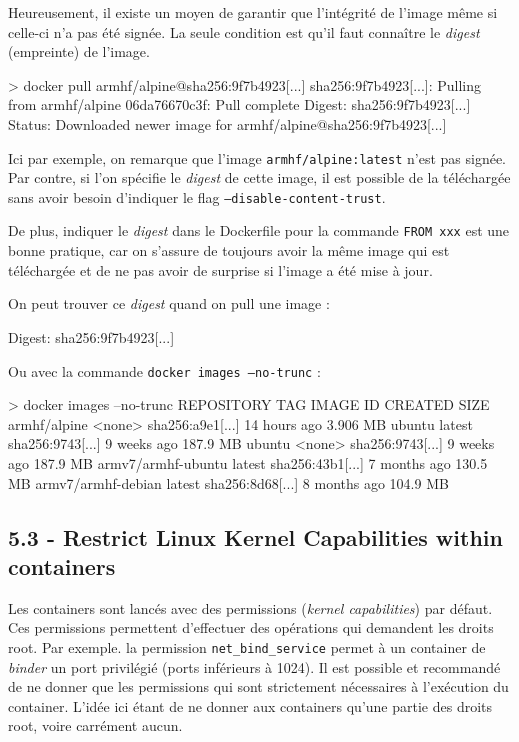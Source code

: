 \documentclass[11pt,a4paper,oneside]{report}
\newcommand{\code}[1]{\texttt{#1}}
\begin{document}
Heureusement, il existe un moyen de garantir que l'intégrité de l'image même si celle-ci n'a pas été signée. La seule condition est qu'il faut connaître le \textit{digest} (empreinte) de l'image.

\begin{textcode}
> docker pull armhf/alpine@sha256:9f7b4923[...]
sha256:9f7b4923[...]: Pulling from armhf/alpine
06da76670c3f: Pull complete 
Digest: sha256:9f7b4923[...]
Status: Downloaded newer image for armhf/alpine@sha256:9f7b4923[...]
\end{textcode}

Ici par exemple, on remarque que l'image \code{armhf/alpine:latest} n'est pas signée. Par contre, si l'on spécifie le \textit{digest} de cette image, il est possible de la téléchargée sans avoir besoin d'indiquer le flag \code{--disable-content-trust}.

De plus, indiquer le \textit{digest} dans le Dockerfile pour la commande \code{FROM xxx} est une bonne pratique, car on s'assure de toujours avoir la même image qui est téléchargée et de ne pas avoir de surprise si l'image a été mise à jour.

On peut trouver ce \textit{digest} quand on pull une image :
\begin{textcode}
Digest: sha256:9f7b4923[...]
\end{textcode}

Ou avec la commande \code{docker images --no-trunc} :

\begin{textcode}
> docker images --no-trunc
REPOSITORY          TAG     IMAGE ID           CREATED        SIZE
armhf/alpine        <none>  sha256:a9e1[...]   14 hours ago   3.906 MB
ubuntu              latest  sha256:9743[...]   9 weeks ago    187.9 MB
ubuntu              <none>  sha256:9743[...]   9 weeks ago    187.9 MB
armv7/armhf-ubuntu  latest  sha256:43b1[...]   7 months ago   130.5 MB
armv7/armhf-debian  latest  sha256:8d68[...]   8 months ago   104.9 MB
\end{textcode}

\subsection{5.3  - Restrict Linux Kernel Capabilities within containers}\label{ss-restrict-kernel-capa}
Les containers sont lancés avec des permissions (\textit{kernel capabilities}) par défaut. Ces permissions permettent d'effectuer des opérations qui demandent les droits root. Par exemple. la permission \code{net\_bind\_service} permet à un container de \textit{binder} un port privilégié (ports inférieurs à 1024). Il est possible et recommandé de ne donner que les permissions qui sont strictement nécessaires à l'exécution du container. L'idée ici étant de ne donner aux containers qu'une partie des droits root, voire carrément aucun.
\end{document}
